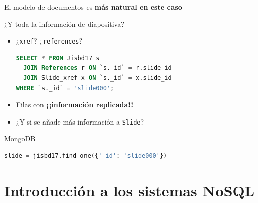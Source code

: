 \documentclass[14pt]{beamer}
\begin{document}
\begin{frame}
\begin{itemize}
\end{itemize}

\begin{block}{El modelo de documentos es {\bf más natural en este caso}}
\end{block}

\framebreak

\begin{alertblock}{¿Y toda la información de diapositiva?}
\begin{itemize}
\begin{lstlisting}[language=sql]
SELECT * FROM Slides WHERE `_id` = 'slide000';
\end{lstlisting}
  \item ¿{\tt xref}? ¿{\tt references}?
\begin{lstlisting}[language=sql]
SELECT * FROM Jisbd17 s
  JOIN References r ON `s._id` = r.slide_id
  JOIN Slide_xref x ON `s._id` = x.slide_id
WHERE `s._id` = 'slide000';
\end{lstlisting}
\item Filas con {\bf ¡¡información replicada!!}
\item ¿Y si se añade más información a {\tt Slide}?
  \end{itemize}
\end{alertblock}

\framebreak

\begin{block}{MongoDB}
\begin{lstlisting}[language=Python]
slide = jisbd17.find_one({'_id': 'slide000'})
\end{lstlisting}
\end{block}

\end{frame}


\section{Introducción a los sistemas NoSQL}
\end{document}
